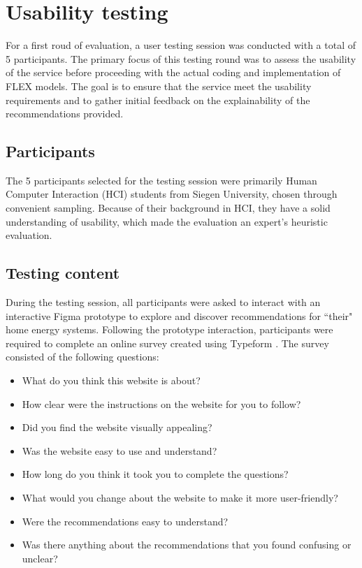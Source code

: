 \section{Usability testing}

For a first roud of evaluation, a user testing session was conducted with a total of 5 participants. 
The primary focus of this testing round was to assess the usability of the service before proceeding with the actual coding and implementation of FLEX models. 
The goal is to ensure that the service meet the usability requirements and to gather initial feedback on the explainability of the recommendations provided.


\subsection{Participants}

The 5 participants selected for the testing session were primarily Human Computer Interaction (HCI) students from Siegen University, chosen through convenient sampling. 
Because of their background in HCI, they have a solid understanding of usability, which made the evaluation an expert's heuristic evaluation. 


\subsection{Testing content}

During the testing session, all participants were asked to interact with an interactive Figma prototype to explore and discover recommendations for ``their" home energy systems. 
Following the prototype interaction, participants were required to complete an online survey created using Typeform \cite{typeform}.
The survey consisted of the following questions: 
\begin{itemize}
  \item What do you think this website is about?
  \item How clear were the instructions on the website for you to follow?
  \item Did you find the website visually appealing?
  \item Was the website easy to use and understand?
  \item How long do you think it took you to complete the questions? 
  \item What would you change about the website to make it more user-friendly?
  \item Were the recommendations easy to understand?
  \item Was there anything about the recommendations that you found confusing or unclear?
\end{itemize}


